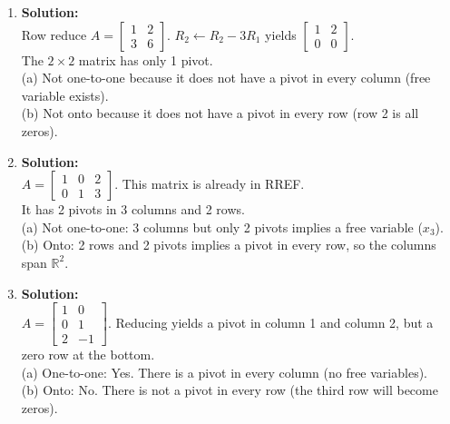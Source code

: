 \documentclass[12pt]{article}
\begin{document}
\begin{enumerate}
    \item \textbf{Solution:}\\
    Row reduce $A = \begin{bmatrix} 1 & 2 \\ 3 & 6 \end{bmatrix}$. $R_2 \leftarrow R_2 - 3R_1$ yields $\begin{bmatrix} 1 & 2 \\ 0 & 0 \end{bmatrix}$. \\
    The $2 \times 2$ matrix has only 1 pivot. \\
    (a) Not one-to-one because it does not have a pivot in every column (free variable exists). \\
    (b) Not onto because it does not have a pivot in every row (row 2 is all zeros).

    \item \textbf{Solution:}\\
    $A = \begin{bmatrix} 1 & 0 & 2 \\ 0 & 1 & 3 \end{bmatrix}$. This matrix is already in RREF. \\
    It has 2 pivots in 3 columns and 2 rows. \\
    (a) Not one-to-one: 3 columns but only 2 pivots implies a free variable ($x_3$). \\
    (b) Onto: 2 rows and 2 pivots implies a pivot in every row, so the columns span $\mathbb{R}^2$.

    \item \textbf{Solution:}\\
    $A = \begin{bmatrix} 1 & 0 \\ 0 & 1 \\ 2 & -1 \end{bmatrix}$. Reducing yields a pivot in column 1 and column 2, but a zero row at the bottom. \\
    (a) One-to-one: Yes. There is a pivot in every column (no free variables). \\
    (b) Onto: No. There is not a pivot in every row (the third row will become zeros).


\end{enumerate}
\end{document}
